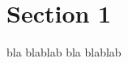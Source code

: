 \documentclass{article}
\begin{document}
\section{Section 1}
bla blablab
\newpage
bla blablab
\printindex 
\end{document}
